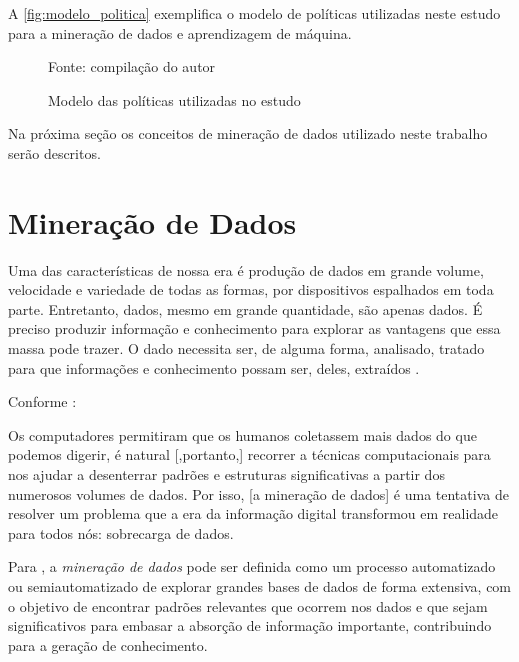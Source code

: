 A \autoref{fig:modelo_politica} exemplifica o modelo de políticas utilizadas neste estudo para a mineração de dados e aprendizagem de máquina.

\begin{figure}[h!]
	\centering
	\caption{Modelo das políticas utilizadas no estudo}
	
	{\scriptsize Fonte: compilação do autor}
	\label{fig:modelo_politica}
\end{figure}

Na próxima seção os conceitos de mineração de dados utilizado neste trabalho serão descritos.

\section{Mineração de Dados}\label{mineracao_dados}
Uma das características de nossa era é produção de dados em grande volume, velocidade e variedade de todas as formas, por dispositivos espalhados em toda parte. Entretanto, dados, mesmo em grande quantidade, são apenas dados. É preciso produzir informação e conhecimento para explorar as vantagens que essa massa pode trazer. O dado necessita ser, de alguma forma, analisado, tratado para que informações e conhecimento possam ser, deles, extraídos \cite{aprenda_mineracao_fernando_amaral16} \cite{ferrari2017}.

Conforme :
\begin{citacao}
	 Os computadores permitiram que os humanos coletassem mais dados do que podemos digerir, é natural [,portanto,] recorrer a técnicas computacionais para nos ajudar a desenterrar padrões e estruturas significativas a partir dos numerosos volumes de dados. Por isso, [a mineração de dados] é uma tentativa de resolver um problema que a era da informação digital transformou em realidade para todos nós: sobrecarga de dados.
\end{citacao}

Para , a \textit{mineração de dados} pode ser definida como um processo automatizado ou semiautomatizado de explorar grandes bases de dados de forma extensiva, com o objetivo de encontrar padrões relevantes que ocorrem nos dados e que sejam significativos para embasar a absorção de informação importante, contribuindo para a geração de conhecimento. 

